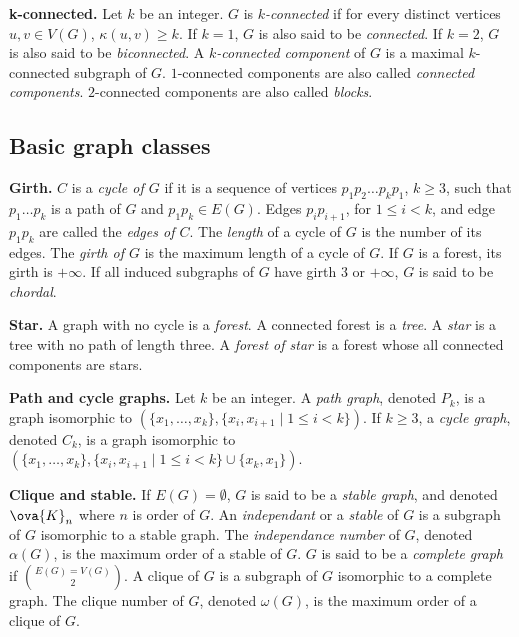 
\medskip

\textbf{k-connected.}
Let $k$ be an integer. $G$ is \emph{$k$-connected} if for every distinct vertices $u, v \in V(G)$, $\kappa(u,v) \geq k$. If $k = 1$, $G$ is also said to be \emph{connected}. If $k = 2$, $G$ is also said to be \emph{biconnected}.
A \emph{$k$-connected component} of $G$ is a maximal $k$-connected subgraph of $G$. $1$-connected components are also called \emph{connected components}. $2$-connected components are also called \emph{blocks}.


\subsection{Basic graph classes}


\textbf{Girth.}
$C$ is a \emph{cycle of $G$} if it is a sequence of vertices $p_1p_2\ldots p_kp_1$, $k \geq 3$, such that $p_1\ldots p_k$ is a path of $G$ and $p_1p_k \in E(G)$.
Edges $p_ip_{i+1}$,  for  $1\leq i <k$, and edge $p_1p_k$ are called the {\em edges of $C$}.
The {\em length} of a cycle of $G$ is the number of its edges. The \emph{girth of $G$} is the maximum length of a cycle of $G$. If $G$ is a forest, its girth is $+\infty$. If all induced subgraphs of $G$ have girth $3$ or $+\infty$, $G$ is said to be \emph{chordal}.

\medskip

\textbf{Star.}
A graph with no cycle is a \emph{forest}. A connected forest is a \emph{tree}. A \emph{star} is a tree with no path of length three. A \emph{forest of star} is a forest whose all connected components are stars.

\medskip

\textbf{Path and cycle graphs.}
Let $k$ be an integer. A \emph{path graph}, denoted $P_k$, is a graph isomorphic to $(\{x_1,\dots, x_k\}, \{x_i, x_{i+1} \mid 1 \leq i < k \})$. If $k \geq 3$, a \emph{cycle graph}, denoted $C_k$, is a graph isomorphic to $(\{x_1,\dots, x_k\}, \{x_i, x_{i+1} \mid 1 \leq i < k \} \cup \{x_k,x_1\})$.

\medskip

\textbf{Clique and stable.}
If $E(G) = \emptyset$, $G$ is said to be a \emph{stable graph}, and denoted $\ova{K}_n$ where $n$ is order of $G$. An \emph{independant} or a \emph{stable} of $G$ is a subgraph of $G$ isomorphic to a stable graph. The \emph{independance number} of $G$, denoted $\alpha(G)$, is the maximum order of a stable of $G$.
$G$ is said to be a \emph{complete graph} if $E(G) = V(G) \choose 2$. A clique of $G$ is a subgraph of $G$ isomorphic to a complete graph. The clique number of $G$, denoted $\omega(G)$, is the maximum order of a clique of $G$.

